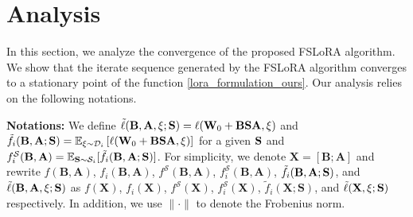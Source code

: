 \documentclass{article} %
\theoremstyle{plain}
\theoremstyle{definition}
\newcommand{\eqdef}{\coloneqq}
\begin{document}
\section{Analysis} \label{sec:analysis}
In this section, we analyze the convergence of the proposed FSLoRA algorithm. We show that the iterate sequence generated by the FSLoRA algorithm converges to a stationary point of the function \eqref{lora_formulation_ours}. Our analysis relies on the following notations.
 
\textbf{Notations:} We define \(\tilde{\ell} ({\bf B}, {\bf A}, \xi; {\bf S}) = \ell ({\bf W}_{0} + {\bf B} {\bf S} {\bf A}, \xi)\) and
\(\tilde{f}_{i} ({\bf B}, {\bf A}; {\bf S}) = \mathbb{E}_{\xi \sim \mathcal{D}_i} \left[ \ell ({\bf W}_{0} + {\bf B}\bf S{\bf A}, \xi)\right] \) for a given ${\bf S}$ 
and \( f_i^{\mathcal{S}}(\mathbf{B}, \mathbf{A}) = \mathbb{E}_{{\bf S} \sim \mathcal{S}_i} [\tilde{f}_{i} ({\bf B}, \mathbf{A}; {\bf S}) ] \). 
For simplicity, we denote \( \mathbf{X} = [\mathbf{B}; \mathbf{A}] \) and rewrite \( f(\mathbf{B}, \mathbf{A}) \), \( f_i(\mathbf{B}, \mathbf{A}) \), \( f^{\mathcal{S}}(\mathbf{B}, \mathbf{A}) \), \( f_i^{\mathcal{S}}(\mathbf{B}, \mathbf{A}) \), \( \tilde{f}_i({\bf B}, {\bf A}; {\bf S}) \), and \(\tilde{\ell} ({\bf B}, {\bf A}, \xi; {\bf S})\) as \( f(\mathbf{X}) \), \( f_i(\mathbf{X}) \), \( f^{\mathcal{S}}(\mathbf{X}) \), \( f_i^{\mathcal{S}}(\mathbf{X}) \), \( \tilde{f}_{i} (\mathbf{X}; \mathbf{S}) \), and \(\tilde{\ell} ({\bf X}, \xi; {\bf S})\) respectively. In addition, we use \(\|\cdot\|\) to denote the Frobenius norm.
\end{document}
